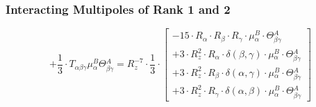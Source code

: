 \documentclass{article}
\begin{document}
\subsubsection{Interacting Multipoles of Rank 1 and 2}
\begin{equation}
+ \frac{1}{3} \cdot T_{\alpha{}\beta{}\gamma{}} \mu{}^{B}_{\alpha{}} \Theta{}^{A}_{\beta{}\gamma{}} = R_{z}^{-7} \cdot \frac{1}{3} \cdot  \left[ \begin{array}{c} 
 		- 15 \cdot R_{\alpha{}} \cdot R_{\beta{}} \cdot R_{\gamma{}} \cdot \mu{}^{B}_{\alpha{}} \cdot \Theta{}^{A}_{\beta{}\gamma{}} 
 \\[0.2em] 		 + 3 \cdot R_{z}^{2} \cdot R_{\alpha{}} \cdot \delta{}\left(\beta{}, \gamma{}\right) \cdot \mu{}^{B}_{\alpha{}} \cdot \Theta{}^{A}_{\beta{}\gamma{}} 
 \\[0.2em] 		 + 3 \cdot R_{z}^{2} \cdot R_{\beta{}} \cdot \delta{}\left(\alpha{}, \gamma{}\right) \cdot \mu{}^{B}_{\alpha{}} \cdot \Theta{}^{A}_{\beta{}\gamma{}} 
 \\[0.2em] 		 + 3 \cdot R_{z}^{2} \cdot R_{\gamma{}} \cdot \delta{}\left(\alpha{}, \beta{}\right) \cdot \mu{}^{B}_{\alpha{}} \cdot \Theta{}^{A}_{\beta{}\gamma{}}
 \end{array}\right] 
\end{equation}
\end{document}
